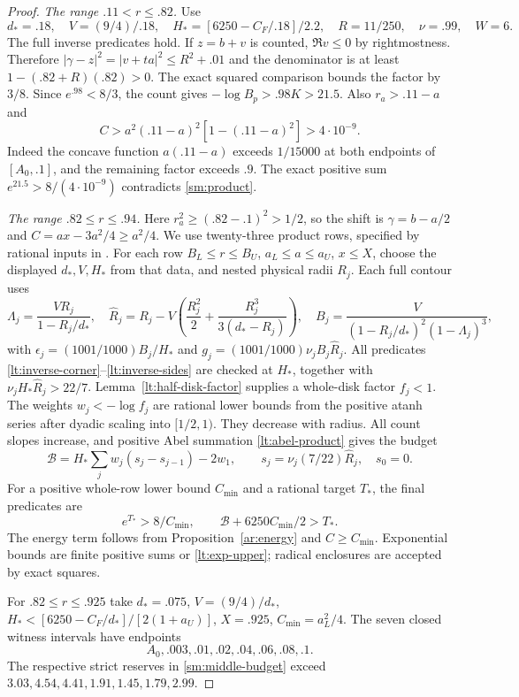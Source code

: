 \begin{proof}
\smallskip\noindent\emph{The range $.11<r\le.82$.}
Use
\[
 d_*=.18,\quad V=(9/4)/.18,\quad
 H_*=[6250-C_F/.18]/2.2,\quad R=11/250,\quad\nu=.99,\quad W=6.
\]
The full inverse predicates hold. If $z=b+v$ is counted,
$\Re v\le0$ by rightmostness. Therefore
$|\gamma-z|^2=|v+ta|^2\le R^2+.01$ and the denominator is
at least $1-(.82+R)(.82)>0$. The exact squared comparison bounds
the factor by $3/8$. Since $e^{.98}<8/3$, the count gives
$-\log B_p>.98K>21.5$.
Also $r_a>.11-a$ and
\[
 C>a^2(.11-a)^2[1-(.11-a)^2]>4\cdot10^{-9}.
\]
Indeed the concave function $a(.11-a)$ exceeds $1/15000$ at
both endpoints of $[A_0,.1]$, and the remaining factor exceeds
$.9$. The exact positive sum $e^{21.5}>8/(4\cdot10^{-9})$
contradicts \eqref{sm:product}.

\smallskip\noindent\emph{The range $.82\le r\le.94$.}
Here $r_a^2\ge(.82-.1)^2>1/2$, so the shift is
$\gamma=b-a/2$ and $C=ax-3a^2/4\ge a^2/4$.
We use twenty-three product rows, specified by rational inputs in
.
For each row $B_L\le r\le B_U$, $a_L\le a\le a_U$, $x\le X$,
choose the displayed $d_*,V,H_*$ from that data, and nested
physical radii $R_j$. Each full contour uses
\[
 \Lambda_j=\frac{VR_j}{1-R_j/d_*},\quad
 \widehat R_j=R_j-V\left(\frac{R_j^2}{2}
                         +\frac{R_j^3}{3(d_*-R_j)}\right),\quad
 B_j=\frac{V}{(1-R_j/d_*)^2(1-\Lambda_j)^3},
\]
with $\epsilon_j=(1001/1000)B_j/H_*$ and
$g_j=(1001/1000)\nu_jB_j\widehat R_j$.
All predicates \eqref{lt:inverse-corner}--\eqref{lt:inverse-sides}
are checked at $H_*$, together with
$\nu_jH_*\widehat R_j>22/7$.
Lemma~\ref{lt:half-disk-factor} supplies a whole-disk factor $f_j<1$.
The weights $w_j<-\log f_j$ are rational lower bounds from the
positive atanh series after dyadic scaling into $[1/2,1)$.
They decrease with radius. All count slopes increase, and positive
Abel summation \eqref{lt:abel-product} gives the budget
\[
 \mathcal B=H_*\sum_jw_j(s_j-s_{j-1})-2w_1,\qquad
 s_j=\nu_j(7/22)\widehat R_j,\quad s_0=0.
\]
For a positive whole-row lower bound $C_{\min}$ and a rational
target $T_*$, the final predicates are
\begin{equation}\label{sm:middle-budget}
 e^{T_*}>8/C_{\min},\qquad
 \mathcal B+6250C_{\min}/2>T_*.
\end{equation}
The energy term follows from Proposition~\ref{ar:energy} and
$C\ge C_{\min}$. Exponential bounds are finite positive sums or
\eqref{lt:exp-upper}; radical enclosures are accepted by exact squares.

For $.82\le r\le.925$ take $d_*=.075$, $V=(9/4)/d_*$,
$H_*<[6250-C_F/d_*]/[2(1+a_U)]$, $X=.925$,
$C_{\min}=a_L^2/4$. The seven closed witness intervals have endpoints
\[
 A_0, .003, .01, .02, .04, .06, .08, .1.
\]
The respective strict reserves in \eqref{sm:middle-budget} exceed
$3.03,4.54,4.41,1.91,1.45,1.79,2.99$.


\end{proof}
